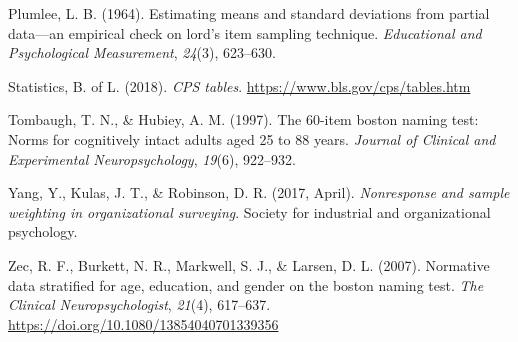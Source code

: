 \documentclass[
  ,man]{apa7}
\newlength{\cslhangindent}
\newlength{\cslentryspacingunit} %
\newenvironment{CSLReferences}[2] %
 {%
  \setlength{\parindent}{0pt}
  \ifodd #1
  \let\oldpar\par
  \def\par{\hangindent=\cslhangindent\oldpar}
  \fi
  \setlength{\parskip}{#2\cslentryspacingunit}
 }%
 {}
\begin{document}
\begin{CSLReferences}{1}{0}
\leavevmode{}%
Plumlee, L. B. (1964). Estimating means and standard deviations from partial data---an empirical check on lord's item sampling technique. \emph{Educational and Psychological Measurement}, \emph{24}(3), 623--630.

\leavevmode{}%
Statistics, B. of L. (2018). \emph{{CPS} tables}. \url{https://www.bls.gov/cps/tables.htm}

\leavevmode{}%
Tombaugh, T. N., \& Hubiey, A. M. (1997). The 60-item boston naming test: Norms for cognitively intact adults aged 25 to 88 years. \emph{Journal of Clinical and Experimental Neuropsychology}, \emph{19}(6), 922--932.

\leavevmode{}%
Yang, Y., Kulas, J. T., \& Robinson, D. R. (2017, April). \emph{Nonresponse and sample weighting in organizational surveying}. Society for industrial and organizational psychology.

\leavevmode{}%
Zec, R. F., Burkett, N. R., Markwell, S. J., \& Larsen, D. L. (2007). Normative data stratified for age, education, and gender on the boston naming test. \emph{The Clinical Neuropsychologist}, \emph{21}(4), 617--637. \url{https://doi.org/10.1080/13854040701339356}

\end{CSLReferences}

\endgroup
\end{document}

